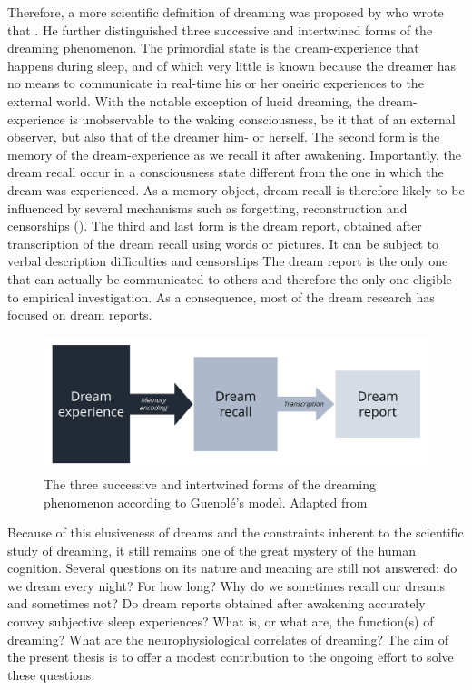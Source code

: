 Therefore, a more scientific definition of dreaming was proposed by \citet{guenole_a_2009} who wrote that . He further distinguished three successive and intertwined forms of the dreaming phenomenon. The primordial state is the dream-experience that happens during sleep, and of which very little is known because the dreamer has no means to communicate in real-time his or her oneiric experiences to the external world. With the notable exception of lucid dreaming, the dream-experience is unobservable to the waking consciousness, be it that of an external observer, but also that of the dreamer him- or herself. The second form is the memory of the dream-experience as we recall it after awakening. Importantly, the dream recall occur in a consciousness state different from the one in which the dream was experienced. As a memory object, dream recall is therefore likely to be influenced by several mechanisms such as forgetting, reconstruction and censorships (\cite{schwartz_sleep_2002, schwartz_dreaming:_2005}). The third and last form is the dream report, obtained after transcription of the dream recall using words or pictures. It can be subject to verbal description difficulties and censorships The dream report is the only one that can actually be communicated to others and therefore the only one eligible to empirical investigation. As a consequence, most of the dream research has focused on dream reports.

\begin{figure}[htb]
	\includegraphics[width=\textwidth]{Fig/Intro/Intro_Guenole/Intro_Guenole.png}
	\caption[Guénolé's model of dreaming]{The three successive and intertwined forms of the dreaming phenomenon according to Guenolé's model. Adapted from \citet{guenole_a_2009}}
	\label{fig:intro:guenole}
\end{figure}

Because of this elusiveness of dreams and the constraints inherent to the scientific study of dreaming, it still remains one of the great mystery of the human cognition. Several questions on its nature and meaning are still not answered: do we dream every night? For how long? Why do we sometimes recall our dreams and sometimes not? Do dream reports obtained after awakening accurately convey subjective sleep experiences? What is, or what are, the function(s) of dreaming? What are the neurophysiological correlates of dreaming? The aim of the present thesis is to offer a modest contribution to the ongoing effort to solve these questions.

